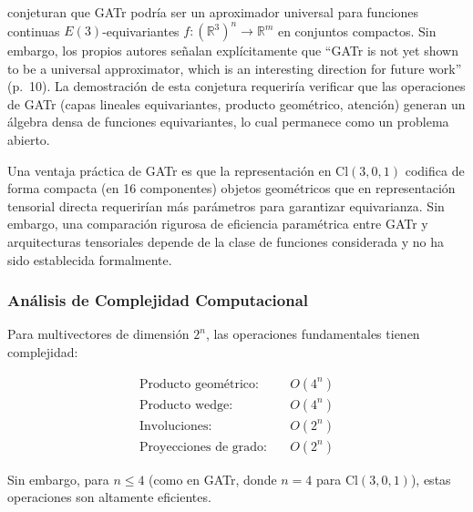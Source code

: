 \begin{remark}\label{rem:aproximacion_universal_clifford}
\citet{brehmer2023geometric} conjeturan que GATr podría ser un aproximador universal para funciones continuas $E(3)$-equivariantes $f: (\mathbb{R}^3)^n \to \mathbb{R}^m$ en conjuntos compactos. Sin embargo, los propios autores señalan explícitamente que ``GATr is not yet shown to be a universal approximator, which is an interesting direction for future work'' (p.~10). La demostración de esta conjetura requeriría verificar que las operaciones de GATr (capas lineales equivariantes, producto geométrico, atención) generan un álgebra densa de funciones equivariantes, lo cual permanece como un problema abierto.
\end{remark}

\begin{remark}\label{cor:eficiencia_parametrica_clifford}
Una ventaja práctica de GATr es que la representación en $\text{Cl}(3,0,1)$ codifica de forma compacta (en 16 componentes) objetos geométricos que en representación tensorial directa requerirían más parámetros para garantizar equivarianza. Sin embargo, una comparación rigurosa de eficiencia paramétrica entre GATr y arquitecturas tensoriales depende de la clase de funciones considerada y no ha sido establecida formalmente.
\end{remark}

\subsubsection{Análisis de Complejidad Computacional}

\begin{proposition}\label{prop:complejidad_clifford}
Para multivectores de dimensión $2^n$, las operaciones fundamentales tienen complejidad:

\begin{align}
    \text{Producto geométrico:} &\quad O(4^n) \\
    \text{Producto wedge:} &\quad O(4^n) \\
    \text{Involuciones:} &\quad O(2^n) \\
    \text{Proyecciones de grado:} &\quad O(2^n)
\end{align}

Sin embargo, para $n \leq 4$ (como en GATr, donde $n = 4$ para $\text{Cl}(3,0,1)$), estas operaciones son altamente eficientes.
\end{proposition}

